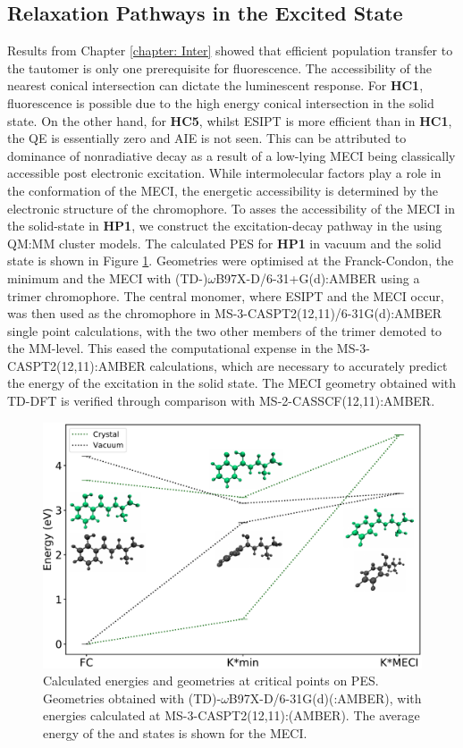 \subsection{Relaxation Pathways in the Excited State}\label{section: Connecting_Relaxation}
Results from Chapter \ref{chapter: Inter} showed that efficient population transfer to the \Kstar{} tautomer is only one prerequisite for fluorescence. The accessibility of the nearest conical intersection can dictate the luminescent response. For \textbf{HC1}, fluorescence is possible due to the high energy conical intersection in the solid state. On the other hand, for \textbf{HC5}, whilst ESIPT is more efficient than in \textbf{HC1}, the QE is essentially zero and AIE is not seen. This can be attributed to dominance of nonradiative decay as a result of a low-lying MECI being classically accessible post electronic excitation. While intermolecular factors play a role in the conformation of the MECI, the energetic accessibility is determined by the electronic structure of the chromophore. To asses the accessibility of the MECI in the solid-state in \textbf{HP1}, we construct the excitation-decay pathway in the using QM:MM cluster models. The calculated PES for \textbf{HP1} in vacuum and the solid state is shown in Figure \ref{figure: HP1_crystal_vs_vac}.
Geometries were optimised at the Franck-Condon, the \Kstar{} minimum and the MECI with (TD-)$\omega$B97X-D/6-31+G(d):AMBER using a trimer chromophore. The central monomer, where ESIPT and the MECI occur, was then used as the chromophore in MS-3-CASPT2(12,11)/6-31G(d):AMBER single point calculations, with the two other members of the trimer demoted to the MM-level. This eased the computational expense in the MS-3-CASPT2(12,11):AMBER calculations, which are necessary to accurately predict the energy of the \sone{} excitation in the solid state. The MECI geometry obtained with TD-DFT is verified through comparison with MS-2-CASSCF(12,11):AMBER.
\begin{figure}[H]
\centering
  \includegraphics[width=0.9\linewidth]{5ConnectingCrystalStructure/HP1_crystal_vs_vac}
  \caption[PES for \textbf{HP1} in vacuum and the solid state]{Calculated energies and geometries at critical points on PES. Geometries obtained with (TD)-$\omega$B97X-D/6-31G(d)(:AMBER), with energies calculated at MS-3-CASPT2(12,11):(AMBER). The average energy of the \sone{} and \szero{} states is shown for the MECI.}
  \label{figure: HP1_crystal_vs_vac}
\end{figure}
